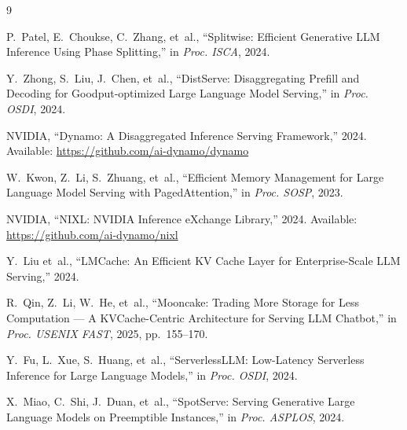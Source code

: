 \documentclass[10pt,twocolumn,letterpaper]{article}
\begin{document}
{
\small

\begin{thebibliography}{9}

P.~Patel, E.~Choukse, C.~Zhang, et~al., ``Splitwise: Efficient Generative LLM Inference Using Phase Splitting,'' in \emph{Proc. ISCA}, 2024.

Y.~Zhong, S.~Liu, J.~Chen, et~al., ``DistServe: Disaggregating Prefill and Decoding for Goodput-optimized Large Language Model Serving,'' in \emph{Proc. OSDI}, 2024.

NVIDIA, ``Dynamo: A Disaggregated Inference Serving Framework,'' 2024. Available: \url{https://github.com/ai-dynamo/dynamo}

W.~Kwon, Z.~Li, S.~Zhuang, et~al., ``Efficient Memory Management for Large Language Model Serving with PagedAttention,'' in \emph{Proc. SOSP}, 2023.

NVIDIA, ``NIXL: NVIDIA Inference eXchange Library,'' 2024. Available: \url{https://github.com/ai-dynamo/nixl}

Y.~Liu et~al., ``LMCache: An Efficient KV Cache Layer for Enterprise-Scale LLM Serving,'' 2024.

R.~Qin, Z.~Li, W.~He, et~al., ``Mooncake: Trading More Storage for Less Computation --- A KVCache-Centric Architecture for Serving LLM Chatbot,'' in \emph{Proc. USENIX FAST}, 2025, pp.~155--170.

Y.~Fu, L.~Xue, S.~Huang, et~al., ``ServerlessLLM: Low-Latency Serverless Inference for Large Language Models,'' in \emph{Proc. OSDI}, 2024.

X.~Miao, C.~Shi, J.~Duan, et~al., ``SpotServe: Serving Generative Large Language Models on Preemptible Instances,'' in \emph{Proc. ASPLOS}, 2024.

\end{thebibliography}
}
\end{document}
